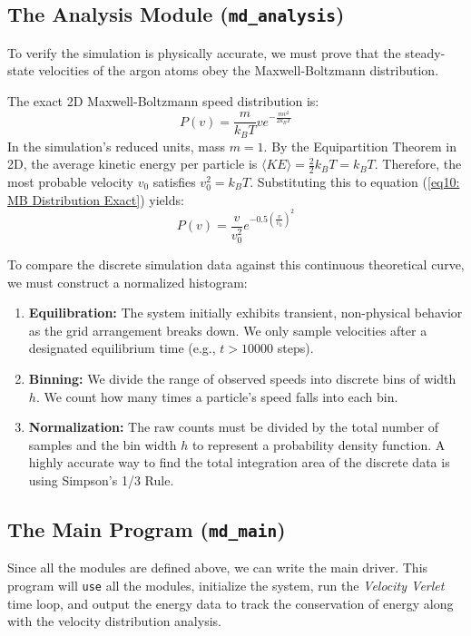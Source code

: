 \documentclass[12pt, a4paper, oneside]{article}
\begin{document}
        \subsection{The Analysis Module (\texttt{md\_analysis})}
        To verify the simulation is physically accurate, we must prove that the steady-state velocities of the argon atoms obey the Maxwell-Boltzmann distribution.

        The exact 2D Maxwell-Boltzmann speed distribution is: 
        \begin{equation}
            \label{eq10: MB Distribution Exact}
            P(v) = \frac{m}{k_B T} v e^{-\frac{mv^2}{2k_B T}}
        \end{equation}
        In the simulation's reduced units, mass $m=1$. By the Equipartition Theorem in 2D, the average kinetic energy per particle is $\langle KE \rangle = \frac{2}{2} k_B T = k_B T$. Therefore, the most probable velocity $v_0$ satisfies $v_0^2 = k_B T$. Substituting this to equation (\ref{eq10: MB Distribution Exact}) yields: 
        \begin{equation}
            \label{eq11: MB Speed Distribution}
            P(v) = \frac{v}{v_0^2} e^{-0.5 \left(\frac{v}{v_0}\right)^2}
        \end{equation}

        To compare the discrete simulation data against this continuous theoretical curve, we must construct a normalized histogram:
        \begin{enumerate}
            \item {\bf Equilibration:} The system initially exhibits transient, non-physical behavior as the grid arrangement breaks down. We only sample velocities after a designated equilibrium time (e.g., $t > 10000$ steps).
            \item {\bf Binning:} We divide the range of observed speeds into discrete bins of width $h$. We count how many times a particle's speed falls into each bin.
            \item {\bf Normalization:} The raw counts must be divided by the total number of samples and the bin width $h$ to represent a probability density function. A highly accurate way to find the total integration area of the discrete data is using Simpson's 1/3 Rule.
        \end{enumerate}
        

        \subsection{The Main Program (\texttt{md\_main})}
        Since all the modules are defined above, we can write the main driver. This program will \texttt{use} all the modules, initialize the system, run the \textit{Velocity Verlet} time loop, and output the energy data to track the conservation of energy along with the velocity distribution analysis.
        
        
\end{document}
